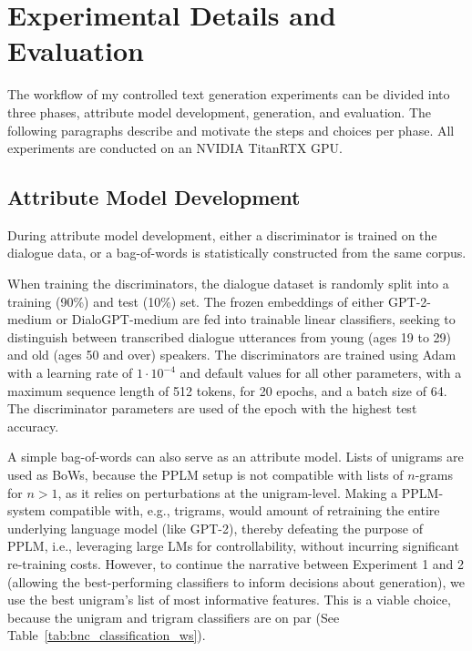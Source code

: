 \section{Experimental Details and Evaluation}


The workflow of my controlled text generation experiments can be divided into three phases, attribute model development, generation, and evaluation. The following paragraphs describe and motivate the steps and choices per phase. All experiments are conducted on an NVIDIA TitanRTX GPU.

\subsection{Attribute Model Development}
During attribute model development, either a discriminator is trained on the dialogue data, or a bag-of-words is statistically constructed from the same corpus.

When training the discriminators, the dialogue dataset is randomly split into a training (90\%) and test (10\%) set. The frozen embeddings of either GPT-2-medium \citep{radford2019language} or DialoGPT-medium \citep{zhang2019dialogpt} are fed into trainable linear classifiers, seeking to distinguish between transcribed dialogue utterances from young (ages 19 to 29) and old (ages 50 and over) speakers. The discriminators are trained using Adam \citep{DBLP:journals/corr/KingmaB14} with a learning rate of $1\cdot10^{-4}$ and default values for all other parameters, with a maximum sequence length of 512 tokens, for 20 epochs, and a batch size of 64. The discriminator parameters are used of the epoch with the highest test accuracy.

A simple bag-of-words can also serve as an attribute model. Lists of unigrams are used as BoWs, because the PPLM setup is not compatible with lists of $n$-grams for $n > 1$, as it relies on perturbations at the unigram-level. Making a PPLM-system compatible with, e.g., trigrams, would amount of retraining the entire underlying language model (like GPT-2), thereby defeating the purpose of PPLM, i.e., leveraging large LMs for controllability, without incurring significant re-training costs. However, to continue the narrative between Experiment 1 and 2 (allowing the best-performing classifiers to inform decisions about generation), we use the best unigram's list of most informative features. This is a viable choice, because the unigram and trigram classifiers are on par (See Table~\ref{tab:bnc_classification_ws}).



